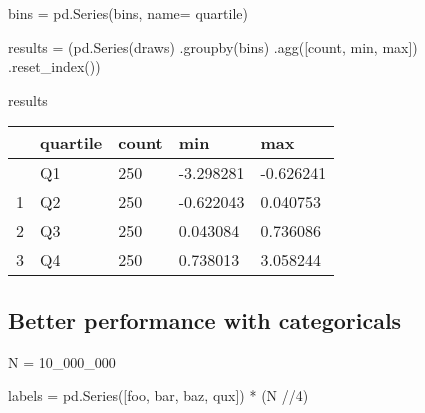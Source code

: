 \documentclass[
  letterpaper,
  DIV=11,
  numbers=noendperiod]{scrreprt}
\newenvironment{Shaded}{\begin{snugshade}}{\end{snugshade}}
\newcommand{\DecValTok}[1]{\textcolor[rgb]{0.68,0.00,0.00}{#1}}
\newcommand{\NormalTok}[1]{\textcolor[rgb]{0.00,0.23,0.31}{#1}}
\newcommand{\OperatorTok}[1]{\textcolor[rgb]{0.37,0.37,0.37}{#1}}
\newcommand{\StringTok}[1]{\textcolor[rgb]{0.13,0.47,0.30}{#1}}
\begin{document}
\begin{Shaded}
\begin{Highlighting}[]
\NormalTok{bins }\OperatorTok{=}\NormalTok{ pd.Series(bins, name}\OperatorTok{=} \StringTok{\textquotesingle{}quartile\textquotesingle{}}\NormalTok{)}

\NormalTok{results }\OperatorTok{=}\NormalTok{ (pd.Series(draws)}
\NormalTok{           .groupby(bins)}
\NormalTok{           .agg([}\StringTok{\textquotesingle{}count\textquotesingle{}}\NormalTok{, }\StringTok{\textquotesingle{}min\textquotesingle{}}\NormalTok{, }\StringTok{\textquotesingle{}max\textquotesingle{}}\NormalTok{])}
\NormalTok{           .reset\_index())}

\NormalTok{results}
\end{Highlighting}
\end{Shaded}

\begin{longtable}[]{@{}lllll@{}}
\toprule\noalign{}
& quartile & count & min & max \\
\midrule\noalign{}
\endhead
\bottomrule\noalign{}
\endlastfoot
0 & Q1 & 250 & -3.298281 & -0.626241 \\
1 & Q2 & 250 & -0.622043 & 0.040753 \\
2 & Q3 & 250 & 0.043084 & 0.736086 \\
3 & Q4 & 250 & 0.738013 & 3.058244 \\
\end{longtable}

\hypertarget{better-performance-with-categoricals}{%
\subsection{Better performance with
categoricals}\label{better-performance-with-categoricals}}

\begin{Shaded}
\begin{Highlighting}[]
\NormalTok{N }\OperatorTok{=} \DecValTok{10\_000\_000}

\NormalTok{labels }\OperatorTok{=}\NormalTok{ pd.Series([}\StringTok{\textquotesingle{}foo\textquotesingle{}}\NormalTok{, }\StringTok{\textquotesingle{}bar\textquotesingle{}}\NormalTok{, }\StringTok{\textquotesingle{}baz\textquotesingle{}}\NormalTok{, }\StringTok{\textquotesingle{}qux\textquotesingle{}}\NormalTok{]) }\OperatorTok{*}\NormalTok{ (N }\OperatorTok{//}\DecValTok{4}\NormalTok{)}
\end{Highlighting}
\end{Shaded}
\end{document}
